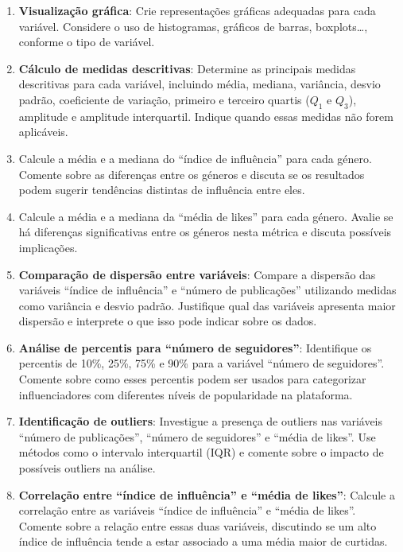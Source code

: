 \documentclass[
]{book}
\newenvironment{Shaded}{\begin{snugshade}}{\end{snugshade}}
\newcommand{\CommentTok}[1]{\textcolor[rgb]{0.56,0.35,0.01}{\textit{#1}}}
\newcommand{\FunctionTok}[1]{\textcolor[rgb]{0.13,0.29,0.53}{\textbf{#1}}}
\newcommand{\NormalTok}[1]{#1}
\newcommand{\OtherTok}[1]{\textcolor[rgb]{0.56,0.35,0.01}{#1}}
\newcommand{\SpecialCharTok}[1]{\textcolor[rgb]{0.81,0.36,0.00}{\textbf{#1}}}
\begin{document}
\begin{Shaded}
\end{Shaded}

\begin{enumerate}
\def\labelenumi{(\alph{enumi})}
\setcounter{enumi}{1}
\item
  \textbf{Visualização gráfica}: Crie representações gráficas adequadas para cada variável. Considere o uso de histogramas, gráficos de barras, boxplots\ldots, conforme o tipo de variável.
\item
  \textbf{Cálculo de medidas descritivas}: Determine as principais medidas descritivas para cada variável, incluindo média, mediana, variância, desvio padrão, coeficiente de variação, primeiro e terceiro quartis (\(Q_1\) e \(Q_3\)), amplitude e amplitude interquartil. Indique quando essas medidas não forem aplicáveis.
\item
  Calcule a média e a mediana do ``índice de influência'' para cada género. Comente sobre as diferenças entre os géneros e discuta se os resultados podem sugerir tendências distintas de influência entre eles.
\item
  Calcule a média e a mediana da ``média de likes'' para cada género. Avalie se há diferenças significativas entre os géneros nesta métrica e discuta possíveis implicações.
\item
  \textbf{Comparação de dispersão entre variáveis}: Compare a dispersão das variáveis ``índice de influência'' e ``número de publicações'' utilizando medidas como variância e desvio padrão. Justifique qual das variáveis apresenta maior dispersão e interprete o que isso pode indicar sobre os dados.
\item
  \textbf{Análise de percentis para ``número de seguidores''}: Identifique os percentis de 10\%, 25\%, 75\% e 90\% para a variável ``número de seguidores''. Comente sobre como esses percentis podem ser usados para categorizar influenciadores com diferentes níveis de popularidade na plataforma.
\item
  \textbf{Identificação de outliers}: Investigue a presença de outliers nas variáveis ``número de publicações'', ``número de seguidores'' e ``média de likes''. Use métodos como o intervalo interquartil (IQR) e comente sobre o impacto de possíveis outliers na análise.
\item
  \textbf{Correlação entre ``índice de influência'' e ``média de likes''}: Calcule a correlação entre as variáveis ``índice de influência'' e ``média de likes''. Comente sobre a relação entre essas duas variáveis, discutindo se um alto índice de influência tende a estar associado a uma média maior de curtidas.
\end{enumerate}
\end{document}
